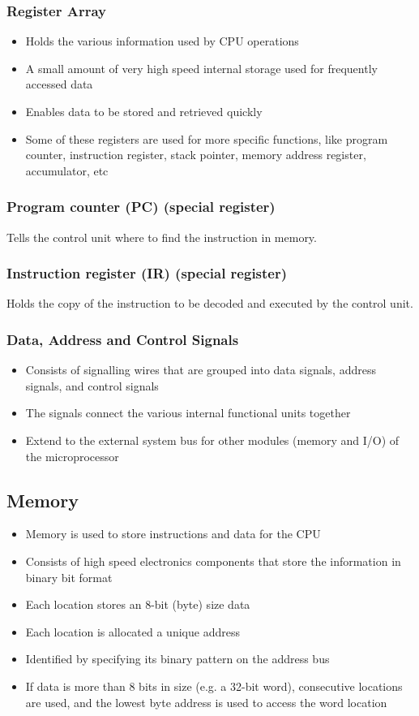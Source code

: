 \documentclass[11pt]{article}
\begin{document}
\subsubsection{Register Array}
\label{sec:orgf56a7ff}
\begin{itemize}
\item Holds the various information used by CPU operations
\item A small amount of very high speed internal storage used for frequently accessed data
\item Enables data to be stored and retrieved quickly
\item Some of these registers are used for more specific functions, like program counter, instruction register, stack pointer, memory address register, accumulator, etc
\end{itemize}
\subsubsection{Program counter (PC) (special register)}
\label{sec:org4b007f5}
Tells the control unit where to find the instruction in memory.
\subsubsection{Instruction register (IR) (special register)}
\label{sec:org643e36f}
Holds the copy of the instruction to be decoded and executed by the control unit.
\subsubsection{Data, Address and Control Signals}
\label{sec:org2fe00fb}
\begin{itemize}
\item Consists of signalling wires that are grouped into data signals, address signals, and control signals
\item The signals connect the various internal functional units together
\item Extend to the external system bus for other modules (memory and I/O) of the microprocessor
\end{itemize}
\subsection{Memory}
\label{sec:orgf682f3b}
\begin{itemize}
\item Memory is used to store instructions and data for the CPU
\item Consists of high speed electronics components that store the information in binary bit format
\item Each location stores an 8-bit (byte) size data
\item Each location is allocated a unique address
\item Identified by specifying its binary pattern on the address bus
\item If data is more than 8 bits in size (e.g. a 32-bit word), consecutive locations are used, and the lowest byte address is used to access the word location
\end{itemize}
\end{document}
